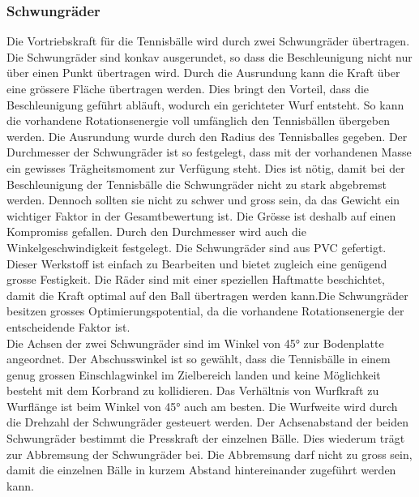 \subsubsection{Schwungräder}
Die Vortriebskraft für die Tennisbälle wird durch zwei Schwungräder übertragen. Die Schwungräder sind konkav ausgerundet, so dass die Beschleunigung nicht nur über einen Punkt übertragen wird. Durch die Ausrundung kann die Kraft über eine grössere Fläche übertragen werden. Dies bringt den Vorteil, dass die Beschleunigung geführt abläuft, wodurch ein gerichteter Wurf entsteht. So kann die vorhandene Rotationsenergie voll umfänglich den Tennisbällen übergeben werden. Die Ausrundung wurde durch den Radius des Tennisballes gegeben. Der Durchmesser der Schwungräder ist so festgelegt, dass mit der vorhandenen Masse ein gewisses Trägheitsmoment zur Verfügung steht. Dies ist nötig, damit bei der Beschleunigung der Tennisbälle die Schwungräder nicht zu stark abgebremst werden. Dennoch sollten sie nicht zu schwer und gross sein, da das Gewicht ein wichtiger Faktor in der Gesamtbewertung ist. Die Grösse ist deshalb auf einen Kompromiss gefallen. Durch den Durchmesser wird auch die Winkelgeschwindigkeit festgelegt. Die Schwungräder sind aus PVC gefertigt. Dieser Werkstoff ist einfach zu Bearbeiten und bietet zugleich eine genügend grosse Festigkeit. Die Räder sind mit einer speziellen Haftmatte beschichtet, damit die Kraft optimal auf den Ball übertragen werden kann.Die Schwungräder besitzen grosses Optimierungspotential, da die vorhandene Rotationsenergie der entscheidende Faktor ist.\\
Die Achsen der zwei Schwungräder sind im Winkel von 45° zur Bodenplatte angeordnet. Der Abschusswinkel ist so gewählt, dass die Tennisbälle in einem genug grossen Einschlagwinkel im Zielbereich landen und keine Möglichkeit besteht mit dem Korbrand zu kollidieren. Das Verhältnis von Wurfkraft zu Wurflänge ist beim Winkel von 45° auch am besten. Die Wurfweite wird durch die Drehzahl der Schwungräder gesteuert werden. Der Achsenabstand der beiden Schwungräder bestimmt die Presskraft der einzelnen Bälle. Dies wiederum trägt zur Abbremsung der Schwungräder bei. Die Abbremsung darf nicht zu gross sein, damit die einzelnen Bälle in kurzem Abstand hintereinander zugeführt werden kann. 
